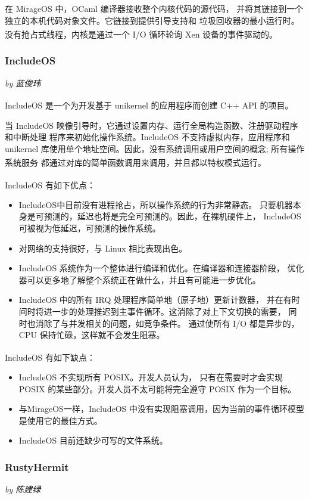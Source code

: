 \documentclass[UTF8,fontset=none,linespread=1.15]{ctexart}
\let\nosupcite\cite
\renewcommand*{\cite}[1]{\textsuperscript{\nosupcite{#1}}}
\newcommand{\sectionauthor}[1]{%
\vspace*{-5ex}
\noindent\textrm{\hfill\textit{by #1}}
\vspace*{2ex}\par}
\begin{document}
在 MirageOS 中，OCaml 编译器接收整个内核代码的源代码，
并将其链接到一个独立的本机代码对象文件。它链接到提供引导支持和
垃圾回收器的最小运行时。没有抢占式线程，内核是通过一个 I/O 循环轮询
Xen 设备的事件驱动的。\cite{bib:11-unikerel2}

\subsubsection{IncludeOS}\sectionauthor{蓝俊玮}

IncludeOS 是一个为开发基于 unikernel 的应用程序而创建 C++ API 的项目。\cite{bib:9-includeos}

当 IncludeOS 映像引导时，它通过设置内存、运行全局构造函数、注册驱动程序和中断处理
程序来初始化操作系统。IncludeOS 不支持虚拟内存，应用程序和
 unikernel 库使用单个地址空间。因此，没有系统调用或用户空间的概念; 所有操作系统服务
 都通过对库的简单函数调用来调用，并且都以特权模式运行。\cite{bib:10-includeos2}

\noindent IncludeOS 有如下优点：\cite{bib:9-includeos}
\begin{itemize}
\item IncludeOS中目前没有进程抢占，所以操作系统的行为非常静态。
只要机器本身是可预测的，延迟也将是完全可预测的。因此，在裸机硬件上，
IncludeOS可被视为低延迟，可预测的操作系统。
\item 对网络的支持很好，与 Linux 相比表现出色。
\item IncludeOS 系统作为一个整体进行编译和优化。在编译器和连接器阶段，
优化器可以更多地了解整个系统正在做什么，并且有可能进一步优化。
\item IncludeOS 中的所有 IRQ 处理程序简单地（原子地）更新计数器，
并在有时间时将进一步的处理推迟到主事件循环。这消除了对上下文切换的需要，
同时也消除了与并发相关的问题，如竞争条件。
通过使所有 I/O 都是异步的，CPU 保持忙碌，这样就不会发生阻塞。
\end{itemize}

\noindent IncludeOS 有如下缺点：\cite{bib:9-includeos}
\begin{itemize}
\item IncludeOS 不实现所有 POSIX。开发人员认为，
只有在需要时才会实现 POSIX 的某些部分。开发人员不太可能将完全遵守 POSIX 作为一个目标。
\item 与MirageOS一样，IncludeOS 中没有实现阻塞调用，因为当前的事件循环模型是使用它的最佳方式。
\item IncludeOS 目前还缺少可写的文件系统。
\end{itemize}

\subsubsection{RustyHermit}\sectionauthor{陈建绿}
\end{document}

